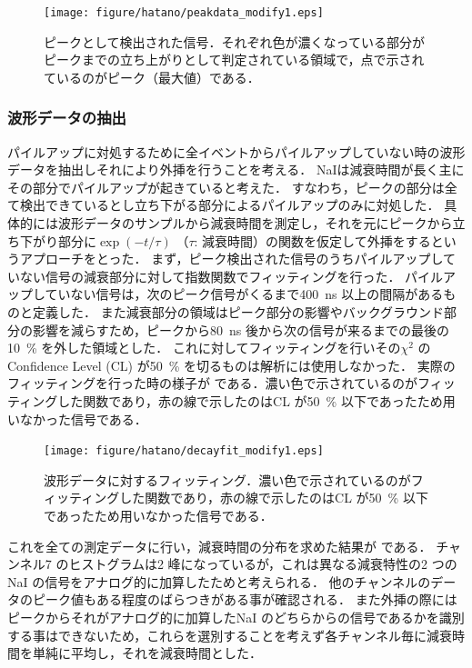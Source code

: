 \begin{figure}[hbt]
\centering
\texttt{[image: figure/hatano/peakdata\_modify1.eps]}
\caption{ピークとして検出された信号．それぞれ色が濃くなっている部分がピークまでの立ち上がりとして判定されている領域で，点で示されているのがピーク（最大値）である．}
\label{hatano_fig:peakdata}
\end{figure}

\subsubsection{波形データの抽出}
パイルアップに対処するために全イベントからパイルアップしていない時の波形データを抽出しそれにより外挿を行うことを考える．
NaIは減衰時間が長く主にその部分でパイルアップが起きていると考えた．
すなわち，ピークの部分は全て検出できているとし立ち下がる部分によるパイルアップのみに対処した．
具体的には波形データのサンプルから減衰時間を測定し，それを元にピークから立ち下がり部分に$\exp(-t/\tau)$ （$\tau$: 減衰時間）の関数を仮定して外挿をするというアプローチをとった．
まず，ピーク検出された信号のうちパイルアップしていない信号の減衰部分に対して指数関数でフィッティングを行った．
パイルアップしていない信号は，次のピーク信号がくるまで400~ns 以上の間隔があるものと定義した．
また減衰部分の領域はピーク部分の影響やバックグラウンド部分の影響を減らすため，ピークから80~ns 後から次の信号が来るまでの最後の10~\% を外した領域とした．
これに対してフィッティングを行いその$\chi^2$ のConfidence Level (CL) が50~\% を切るものは解析には使用しなかった．
実際のフィッティングを行った時の様子が である．濃い色で示されているのがフィッティングした関数であり，赤の線で示したのはCL が50~\% 以下であったため用いなかった信号である．

\begin{figure}[hbt]
\centering
\texttt{[image: figure/hatano/decayfit\_modify1.eps]}
\caption{波形データに対するフィッティング．濃い色で示されているのがフィッティングした関数であり，赤の線で示したのはCL が50~\% 以下であったため用いなかった信号である．}
\label{hatano_fig:decayfit}
\end{figure}

これを全ての測定データに行い，減衰時間の分布を求めた結果が である．
チャンネル7 のヒストグラムは2 峰になっているが，これは異なる減衰特性の2 つのNaI の信号をアナログ的に加算したためと考えられる．
他のチャンネルのデータのピーク値もある程度のばらつきがある事が確認される．
また外挿の際にはピークからそれがアナログ的に加算したNaI のどちらからの信号であるかを識別する事はできないため，これらを選別することを考えず各チャンネル毎に減衰時間を単純に平均し，それを減衰時間とした．

